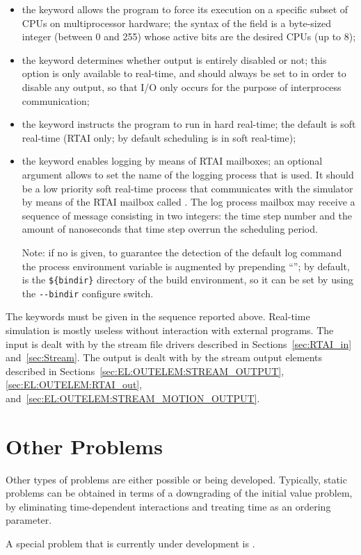 \begin{itemize}
\item the keyword  allows the program to force its
execution on a specific subset of CPUs on multiprocessor hardware;
the syntax of the  field is a byte-sized integer 
(between 0 and 255) whose active bits are the desired CPUs (up to 8);

\item the keyword  determines whether output is entirely disabled
or not; this option is only available to  real-time,
and should always be set to  in order to disable any output,
so that I/O only occurs for the purpose of interprocess communication;

\item the keyword  instructs the program to run
in hard real-time; the default is soft real-time
(RTAI only; by default scheduling is in soft real-time);

\item the keyword  enables logging by means 
of RTAI mailboxes; an optional  argument allows 
to set the name of the logging process that is used.
It should be a low priority soft real-time process that communicates
with the simulator by means of the RTAI mailbox called .
The log process mailbox may receive a sequence of message consisting
in two integers: the time step number and the amount of nanoseconds
that time step overrun the scheduling period.

Note: if no  is given, to guarantee the detection 
of the default log command the process  environment variable 
is augmented by prepending ``''; by default,
 is the \verb;${bindir}; directory of the build environment,
so it can be set by using the \verb;--bindir; configure switch.
\end{itemize}
The keywords must be given in the sequence reported above.
Real-time simulation is mostly useless without interaction 
with external programs.
The input is dealt with by the stream file drivers described
in Sections~\ref{sec:RTAI_in} and~\ref{sec:Stream}.
The output is dealt with by the stream output
elements described in Sections~\ref{sec:EL:OUTELEM:STREAM_OUTPUT},
\ref{sec:EL:OUTELEM:RTAI_out},
and~\ref{sec:EL:OUTELEM:STREAM_MOTION_OUTPUT}.

\section{Other Problems}
Other types of problems are either possible or being developed.
Typically, static problems can be obtained in terms of a downgrading
of the initial value problem, by eliminating time-dependent
interactions and treating time as an ordering parameter.

A special problem that is currently under development
is .

